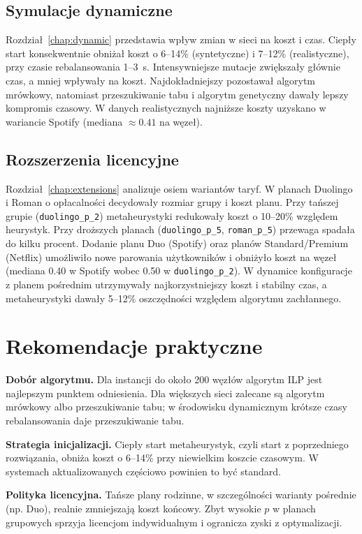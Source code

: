 \subsection{Symulacje dynamiczne}
Rozdział~\ref{chap:dynamic} przedstawia wpływ zmian w sieci na koszt i czas. Ciepły start konsekwentnie obniżał koszt o 6--14\% (syntetyczne) i 7--12\% (realistyczne), przy czasie rebalansowania 1--3~s. Intensywniejsze mutacje zwiększały głównie czas, a mniej wpływały na koszt. Najdokładniejszy pozostawał algorytm mrówkowy, natomiast przeszukiwanie tabu i algorytm genetyczny dawały lepszy kompromis czasowy. W danych realistycznych najniższe koszty uzyskano w wariancie Spotify (mediana $\approx 0.41$ na węzeł).

\subsection{Rozszerzenia licencyjne}
Rozdział~\ref{chap:extensions} analizuje osiem wariantów taryf. W planach Duolingo i Roman o opłacalności decydowały rozmiar grupy i koszt planu. Przy tańszej grupie (\texttt{duolingo\_p\_2}) metaheurystyki redukowały koszt o 10--20\% względem heurystyk. Przy droższych planach (\texttt{duolingo\_p\_5}, \texttt{roman\_p\_5}) przewaga spadała do kilku procent. Dodanie planu Duo (Spotify) oraz planów Standard/Premium (Netflix) umożliwiło nowe parowania użytkowników i obniżyło koszt na węzeł (mediana 0.40 w Spotify wobec 0.50 w \texttt{duolingo\_p\_2}). W dynamice konfiguracje z planem pośrednim utrzymywały najkorzystniejszy koszt i stabilny czas, a metaheurystyki dawały 5--12\% oszczędności względem algorytmu zachłannego.

\section{Rekomendacje praktyczne}

\textbf{Dobór algorytmu.} Dla instancji do około 200 węzłów algorytm ILP jest najlepszym punktem odniesienia. Dla większych sieci zalecane są algorytm mrówkowy albo przeszukiwanie tabu; w środowisku dynamicznym krótsze czasy rebalansowania daje przeszukiwanie tabu.

\textbf{Strategia inicjalizacji.} Ciepły start metaheurystyk, czyli start z poprzedniego rozwiązania, obniża koszt o 6--14\% przy niewielkim koszcie czasowym. W systemach aktualizowanych częściowo powinien to być standard.

\textbf{Polityka licencyjna.} Tańsze plany rodzinne, w szczególności warianty pośrednie (np. Duo), realnie zmniejszają koszt końcowy. Zbyt wysokie $p$ w planach grupowych sprzyja licencjom indywidualnym i ogranicza zyski z optymalizacji.

